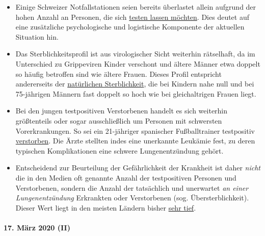 \begin{itemize}
\tightlist
\item
  Einige Schweizer Notfallstationen seien bereits überlastet allein
  aufgrund der hohen Anzahl an Personen, die sich
  \href{https://insideparadeplatz.ch/2020/03/16/notfall-stationen-bereits-seit-tagen-am-anschlag/}{testen
  lassen möchten}. Dies deutet auf eine zusätzliche psychologische und
  logistische Komponente der aktuellen Situation hin.
\item
  Das Sterblichkeitsprofil ist aus virologischer Sicht weiterhin
  rätselhaft, da im Unterschied zu Grippeviren Kinder verschont und
  ältere Männer etwa doppelt so häufig betroffen sind wie ältere Frauen.
  Dieses Profil entspricht andererseits der
  \href{http://www.gbe-bund.de/gbe10/abrechnung.prc_abr_test_logon?p_uid=gast\&p_aid=0\&p_knoten=FID\&p_sprache=D\&p_suchstring=820}{natürlichen
  Sterblichkeit}, die bei Kindern nahe null und bei 75-jährigen Männern
  fast doppelt so hoch wie bei gleichaltrigen Frauen liegt.
\item
  Bei den jungen testpositiven Verstorbenen handelt es sich weiterhin
  größtenteils oder sogar ausschließlich um Personen mit schwersten
  Vorerkrankungen. So sei ein 21-jähriger spanischer Fußballtrainer
  testpositiv
  \href{https://www.msn.com/de-ch/news/other/spanischer-nachwuchs-trainer-stirbt-an-corona/ar-BB11gT64}{verstorben}.
  Die Ärzte stellten indes eine unerkannte Leukämie fest, zu deren
  typischen Komplikationen eine schwere Lungen­ent­zündung gehört.
\item
  Entscheidend zur Beurteilung der Gefährlichkeit der Krankheit ist
  daher \emph{nicht} die in den Medien oft genannte Anzahl der
  testpositiven Personen und Verstorbenen, sondern die Anzahl der
  tatsächlich und unerwartet \emph{an einer Lungenentzündung} Erkrankten
  oder Verstorbenen (sog. Übersterblichkeit). Dieser Wert liegt in den
  meisten Ländern bisher \href{https://www.euromomo.eu/index.html}{sehr
  tief}.
\end{itemize}

\hypertarget{17-muxe4rz-2020-ii}{%
\paragraph{17. März 2020 (II)}\label{17-muxe4rz-2020-ii}}

